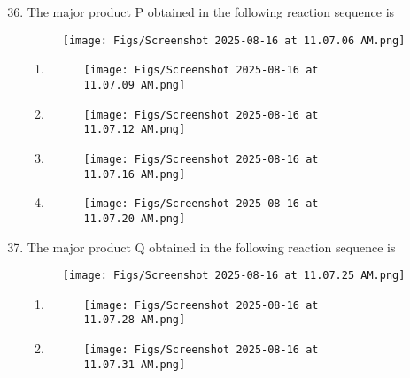 \documentclass[12pt]{article}
\begin{document}
\begin{enumerate} \setcounter{enumi}{35}
    \item The major product P obtained in the following reaction sequence is
\begin{figure}[H]
\centering
\texttt{[image: Figs/Screenshot 2025-08-16 at 11.07.06 AM.png]}
\caption{}
\end{figure}
  

\begin{enumerate} 
    \item \begin{figure}[H]
\centering
\texttt{[image: Figs/Screenshot 2025-08-16 at 11.07.09 AM.png]}
\caption{}
\end{figure}

\item  \begin{figure}[H]
\centering
\texttt{[image: Figs/Screenshot 2025-08-16 at 11.07.12 AM.png]}
\caption{}
\end{figure}


\item  \begin{figure}[H]
\centering
\texttt{[image: Figs/Screenshot 2025-08-16 at 11.07.16 AM.png]}
\caption{}
\end{figure}

\item  
\begin{figure}[H]
\centering
\texttt{[image: Figs/Screenshot 2025-08-16 at 11.07.20 AM.png]}
\caption{}
\end{figure}

\end{enumerate}

\item The major product Q obtained in the following reaction sequence is
\begin{figure}[H]
\centering
\texttt{[image: Figs/Screenshot 2025-08-16 at 11.07.25 AM.png]}
\caption{}
\end{figure}
  

\begin{enumerate} 
    \item \begin{figure}[H]
\centering
\texttt{[image: Figs/Screenshot 2025-08-16 at 11.07.28 AM.png]}
\caption{}
\end{figure}

\item  \begin{figure}[H]
\centering
\texttt{[image: Figs/Screenshot 2025-08-16 at 11.07.31 AM.png]}
\caption{}
\end{figure}



\end{enumerate}
\end{enumerate}
\end{document}
